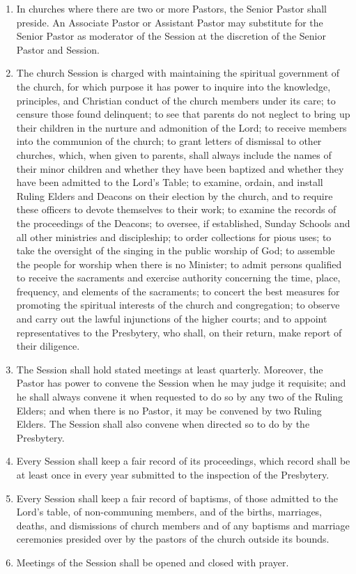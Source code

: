 \documentclass[
]{book}
\begin{document}
\begin{enumerate}
\item
  \protect\hypertarget{14.4}{\href{}{}}In churches where there are two or more Pastors, the Senior Pastor shall preside. An Associate Pastor or Assistant Pastor may substitute for the Senior Pastor as moderator of the Session at the discretion of the Senior Pastor and Session.
\item
  \protect\hypertarget{14.5}{\href{}{}}The church Session is charged with maintaining the spiritual government of the church, for which purpose it has power to inquire into the knowledge, principles, and Christian conduct of the church members under its care; to censure those found delinquent; to see that parents do not neglect to bring up their children in the nurture and admonition of the Lord; to receive members into the communion of the church; to grant letters of dismissal to other churches, which, when given to parents, shall always include the names of their minor children and whether they have been baptized and whether they have been admitted to the Lord's Table; to examine, ordain, and install Ruling Elders and Deacons on their election by the church, and to require these officers to devote themselves to their work; to examine the records of the proceedings of the Deacons; to oversee, if established, Sunday Schools and all other ministries and discipleship; to order collections for pious uses; to take the oversight of the singing in the public worship of God; to assemble the people for worship when there is no Minister; to admit persons qualified to receive the sacraments and exercise authority concerning the time, place, frequency, and elements of the sacraments; to concert the best measures for promoting the spiritual interests of the church and congregation; to observe and carry out the lawful injunctions of the higher courts; and to appoint representatives to the Presbytery, who shall, on their return, make report of their diligence.
\item
  The Session shall hold stated meetings at least quarterly. Moreover, the Pastor has power to convene the Session when he may judge it requisite; and he shall always convene it when requested to do so by any two of the Ruling Elders; and when there is no Pastor, it may be convened by two Ruling Elders. The Session shall also convene when directed so to do by the Presbytery.
\item
  Every Session shall keep a fair record of its proceedings, which record shall be at least once in every year submitted to the inspection of the Presbytery.
\item
  Every Session shall keep a fair record of baptisms, of those admitted to the Lord's table, of non-communing members, and of the births, marriages, deaths, and dismissions of church members and of any baptisms and marriage ceremonies presided over by the pastors of the church outside its bounds.
\item
  Meetings of the Session shall be opened and closed with prayer.
\end{enumerate}
\end{document}
